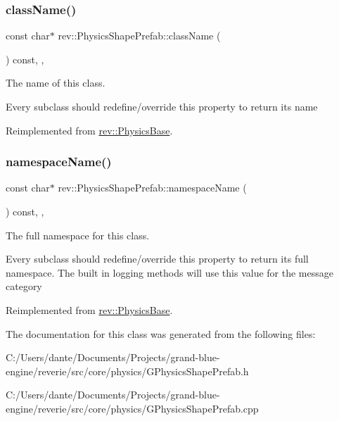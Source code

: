 \subsubsection{\texorpdfstring{className()}{className()}}
{\footnotesize\ttfamily const char$\ast$ rev\+::\+Physics\+Shape\+Prefab\+::class\+Name (\begin{DoxyParamCaption}{ }\end{DoxyParamCaption}) const\hspace{0.3cm}{\ttfamily [inline]}, {\ttfamily [override]}, {\ttfamily [virtual]}}



The name of this class. 

Every subclass should redefine/override this property to return its name 

Reimplemented from \mbox{\hyperlink{classrev_1_1_physics_base_ad997bc1504ff6dccccbc3d8d0ea6e6a5}{rev\+::\+Physics\+Base}}.

\mbox{\label{classrev_1_1_physics_shape_prefab_a2b7e566022a8f94246d92e392ebb2079}} 
\subsubsection{\texorpdfstring{namespaceName()}{namespaceName()}}
{\footnotesize\ttfamily const char$\ast$ rev\+::\+Physics\+Shape\+Prefab\+::namespace\+Name (\begin{DoxyParamCaption}{ }\end{DoxyParamCaption}) const\hspace{0.3cm}{\ttfamily [inline]}, {\ttfamily [override]}, {\ttfamily [virtual]}}



The full namespace for this class. 

Every subclass should redefine/override this property to return its full namespace. The built in logging methods will use this value for the message category 

Reimplemented from \mbox{\hyperlink{classrev_1_1_physics_base_acf58cc81cff2ca957dcc68fe9a9a84a1}{rev\+::\+Physics\+Base}}.



The documentation for this class was generated from the following files\+:\begin{DoxyCompactItemize}
\item 
C\+:/\+Users/dante/\+Documents/\+Projects/grand-\/blue-\/engine/reverie/src/core/physics/G\+Physics\+Shape\+Prefab.\+h\item 
C\+:/\+Users/dante/\+Documents/\+Projects/grand-\/blue-\/engine/reverie/src/core/physics/G\+Physics\+Shape\+Prefab.\+cpp\end{DoxyCompactItemize}
